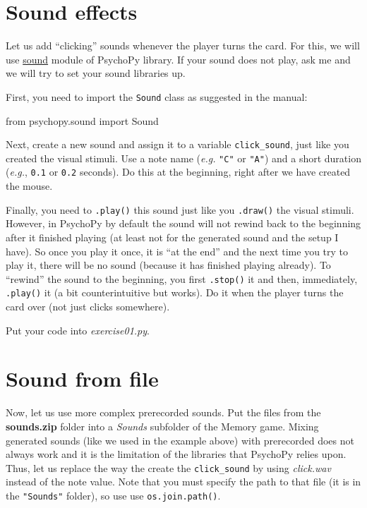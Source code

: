 \documentclass[
]{book}
\newenvironment{Shaded}{\begin{snugshade}}{\end{snugshade}}
\newcommand{\ImportTok}[1]{#1}
\newcommand{\NormalTok}[1]{#1}
\begin{document}
\hypertarget{sound-effects}{%
\section{Sound effects}\label{sound-effects}}

Let us add ``clicking'' sounds whenever the player turns the card. For this, we will use \href{https://psychopy.org/api/sound.html\#ptb-sound}{sound} module of PsychoPy library. If your sound does not play, ask me and we will try to set your sound libraries up.

First, you need to import the \texttt{Sound} class as suggested in the manual:

\begin{Shaded}
\begin{Highlighting}[]
\ImportTok{from}\NormalTok{ psychopy.sound }\ImportTok{import}\NormalTok{ Sound}
\end{Highlighting}
\end{Shaded}

Next, create a new sound and assign it to a variable \texttt{click\_sound}, just like you created the visual stimuli. Use a note name (\emph{e.g.} \texttt{"C"} or \texttt{"A"}) and a short duration (\emph{e.g.}, \texttt{0.1} or \texttt{0.2} seconds). Do this at the beginning, right after we have created the mouse.

Finally, you need to \texttt{.play()} this sound just like you \texttt{.draw()} the visual stimuli. However, in PsychoPy by default the sound will not rewind back to the beginning after it finished playing (at least not for the generated sound and the setup I have). So once you play it once, it is ``at the end'' and the next time you try to play it, there will be no sound (because it has finished playing already). To ``rewind'' the sound to the beginning, you first \texttt{.stop()} it and then, immediately, \texttt{.play()} it (a bit counterintuitive but works). Do it when the player turns the card over (not just clicks somewhere).

Put your code into \emph{exercise01.py}.

\hypertarget{sound-from-file}{%
\section{Sound from file}\label{sound-from-file}}

Now, let us use more complex prerecorded sounds. Put the files from the \textbf{sounds.zip} folder into a \emph{Sounds} subfolder of the Memory game. Mixing generated sounds (like we used in the example above) with prerecorded does not always work and it is the limitation of the libraries that PsychoPy relies upon. Thus, let us replace the way the create the \texttt{click\_sound} by using \emph{click.wav} instead of the note value. Note that you must specify the path to that file (it is in the \texttt{"Sounds"} folder), so use use \texttt{os.join.path()}.
\end{document}
